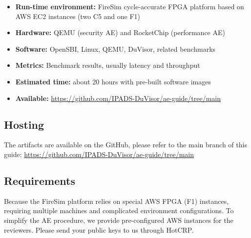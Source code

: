 \documentclass{article}
\begin{document}

\begin{itemize}
    \item \textbf{Run-time environment:} FireSim cycle-accurate FPGA platform based on AWS EC2 instances (two C5 and one F1)
    \item \textbf{Hardware:} QEMU (security AE) and RocketChip (performance AE)
    \item \textbf{Software:} OpenSBI, Linux, QEMU, DuVisor, related benchmarks
    \item \textbf{Metrics:} Benchmark results, usually latency and throughput
    \item \textbf{Estimated time:} about 20 hours with pre-built software images
    \item \textbf{Available:} \url{https://github.com/IPADS-DuVisor/ae-guide/tree/main}
\end{itemize}

\subsection*{Hosting}


The artifacts are available on the GitHub, please refer to the main branch of this guide:
\url{https://github.com/IPADS-DuVisor/ae-guide/tree/main}

\subsection*{Requirements}


Because the FireSim platform relies on special AWS FPGA (F1) instances, requiring multiple machines and complicated environment configurations. To simplify the AE procedure, we provide pre-configured AWS instances for the reviewers. Please send your public keys to us through HotCRP.




\end{document}
